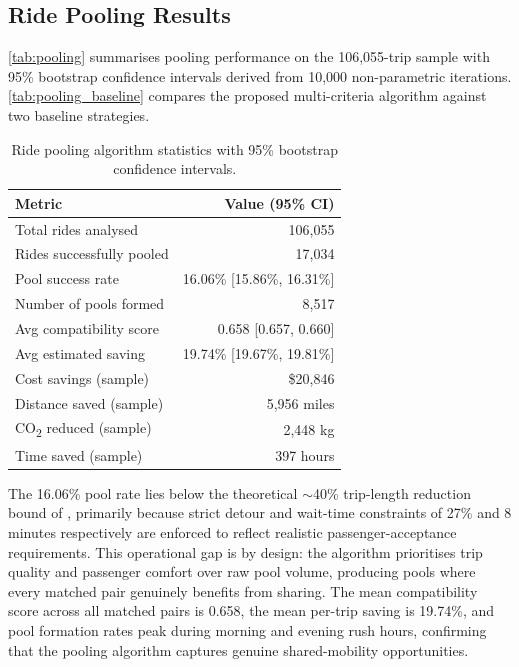 \documentclass[a4paper,fleqn]{cas-dc}
\begin{document}
\subsection{Ride Pooling Results}

\autoref{tab:pooling} summarises pooling performance on the 106,055-trip sample with 95\% bootstrap confidence intervals derived from 10,000 non-parametric iterations.  \autoref{tab:pooling_baseline} compares the proposed multi-criteria algorithm against two baseline strategies.

\begin{table}[t]
\centering
\caption{Ride pooling algorithm statistics with 95\% bootstrap confidence intervals.\label{tab:pooling}}
\begin{tabularx}{\columnwidth}{>{\raggedright\arraybackslash}X r}
\toprule
\textbf{Metric} & \textbf{Value (95\% CI)} \\
\toprule
Total rides analysed      & 106,055 \\
Rides successfully pooled & 17,034 \\
Pool success rate         & 16.06\% [15.86\%, 16.31\%] \\
Number of pools formed    & 8,517 \\
Avg compatibility score   & 0.658 [0.657, 0.660] \\
Avg estimated saving      & 19.74\% [19.67\%, 19.81\%] \\
Cost savings (sample)     & \$20,846 \\
Distance saved (sample)   & 5,956 miles \\
CO\textsubscript{2} reduced (sample) & 2,448 kg \\
Time saved (sample)       & 397 hours \\
\bottomrule
\end{tabularx}
\end{table}

The 16.06\% pool rate lies below the theoretical $\sim$40\% trip-length reduction bound of \cite{santi2014quantifying}, primarily because strict detour and wait-time constraints of 27\% and 8 minutes respectively are enforced to reflect realistic passenger-acceptance requirements.  This operational gap is by design: the algorithm prioritises trip quality and passenger comfort over raw pool volume, producing pools where every matched pair genuinely benefits from sharing.  The mean compatibility score across all matched pairs is 0.658, the mean per-trip saving is 19.74\%, and pool formation rates peak during morning and evening rush hours, confirming that the pooling algorithm captures genuine shared-mobility opportunities.
\end{document}
